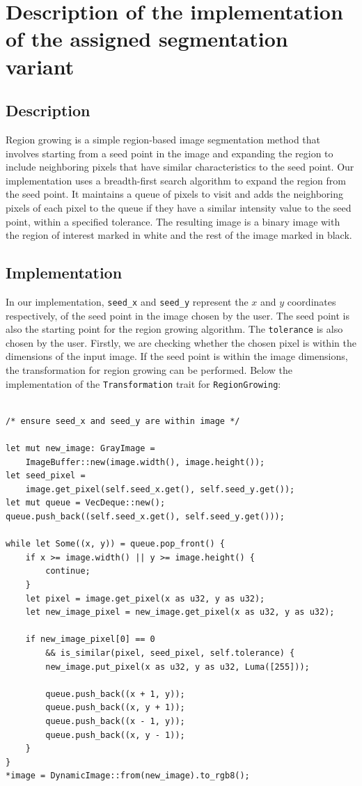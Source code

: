 \documentclass[12pt]{article}
\begin{document}
\section{Description of the implementation of the assigned segmentation variant}
\subsection{Description}
Region growing is a simple region-based image segmentation method that involves starting from a seed point in the image and expanding the region to include neighboring pixels that have similar characteristics to the seed point.
Our implementation uses a breadth-first search algorithm to expand the region from the seed point. It maintains a queue of pixels to visit and adds the neighboring pixels of each pixel to the queue if they have a similar intensity value to the seed point, within a specified tolerance. The resulting image is a binary image with the region of interest marked in white and the rest of the image marked in black.

\subsection{Implementation}

In our implementation, \lstinline{seed_x} and \lstinline{seed_y} represent the $x$ and $y$ coordinates respectively,
of the seed point in the image chosen by the user.
The seed point is also the starting point for the region growing algorithm.
The \lstinline{tolerance} is also chosen by the user.
Firstly, we are checking whether the chosen pixel is within the dimensions of the input image.
If the seed point is within the image dimensions,
the transformation for region growing can be performed.
Below the implementation of the \lstinline{Transformation} trait for \lstinline{RegionGrowing}:

\begin{lstlisting}
    
/* ensure seed_x and seed_y are within image */

let mut new_image: GrayImage = 
    ImageBuffer::new(image.width(), image.height());
let seed_pixel = 
    image.get_pixel(self.seed_x.get(), self.seed_y.get());
let mut queue = VecDeque::new();
queue.push_back((self.seed_x.get(), self.seed_y.get()));

while let Some((x, y)) = queue.pop_front() {
    if x >= image.width() || y >= image.height() {
        continue;
    }
    let pixel = image.get_pixel(x as u32, y as u32);
    let new_image_pixel = new_image.get_pixel(x as u32, y as u32);

    if new_image_pixel[0] == 0 
        && is_similar(pixel, seed_pixel, self.tolerance) {
        new_image.put_pixel(x as u32, y as u32, Luma([255]));

        queue.push_back((x + 1, y));
        queue.push_back((x, y + 1));
        queue.push_back((x - 1, y));
        queue.push_back((x, y - 1));
    }
}
*image = DynamicImage::from(new_image).to_rgb8();
\end{lstlisting}
\end{document}
